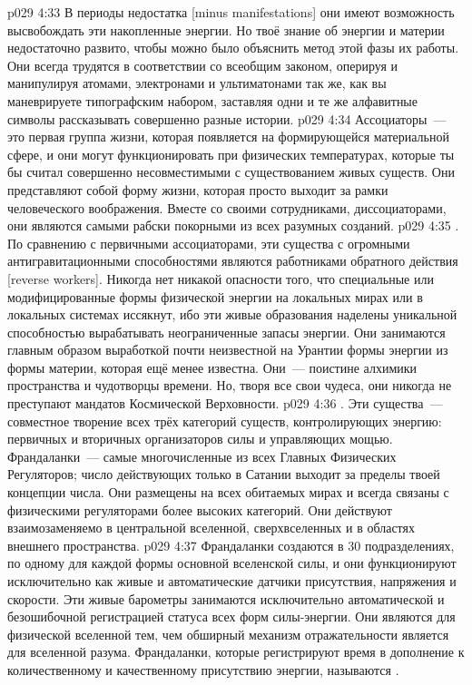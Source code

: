 \vs p029 4:33 В периоды недостатка [minus manifestations] они имеют возможность высвобождать эти накопленные энергии. Но твоё знание об энергии и материи недостаточно развито, чтобы можно было объяснить метод этой фазы их работы. Они всегда трудятся в соответствии со всеобщим законом, оперируя и манипулируя атомами, электронами и ультиматонами так же, как вы маневрируете типографским набором, заставляя одни и те же алфавитные символы рассказывать совершенно разные истории.
\vs p029 4:34 Ассоциаторы~--- это первая группа жизни, которая появляется на формирующейся материальной сфере, и они могут функционировать при физических температурах, которые ты бы считал совершенно несовместимыми с существованием живых существ. Они представляют собой форму жизни, которая просто выходит за рамки человеческого воображения. Вместе со своими сотрудниками, диссоциаторами, они являются самыми рабски покорными из всех разумных созданий.
\vs p029 4:35 . По сравнению с первичными ассоциаторами, эти существа с огромными антигравитационными способностями являются работниками обратного действия [reverse workers]. Никогда нет никакой опасности того, что специальные или модифицированные формы физической энергии на локальных мирах или в локальных системах иссякнут, ибо эти живые образования наделены уникальной способностью вырабатывать неограниченные запасы энергии. Они занимаются главным образом выработкой почти неизвестной на Урантии формы энергии из формы материи, которая ещё менее известна. Они~--- поистине алхимики пространства и чудотворцы времени. Но, творя все свои чудеса, они никогда не преступают мандатов Космической Верховности.
\vs p029 4:36 . Эти существа~--- совместное творение всех трёх категорий существ, контролирующих энергию: первичных и вторичных организаторов силы и управляющих мощью. Франдаланки~--- самые многочисленные из всех Главных Физических Регуляторов; число действующих только в Сатании выходит за пределы твоей концепции числа. Они размещены на всех обитаемых мирах и всегда связаны с физическими регуляторами более высоких категорий. Они действуют взаимозаменяемо в центральной вселенной, сверхвселенных и в областях внешнего пространства.
\vs p029 4:37 Франдаланки создаются в 30 подразделениях, по одному для каждой формы основной вселенской силы, и они функционируют исключительно как живые и автоматические датчики присутствия, напряжения и скорости. Эти живые барометры занимаются исключительно автоматической и безошибочной регистрацией статуса всех форм силы\hyp{}энергии. Они являются для физической вселенной тем, чем обширный механизм отражательности является для вселенной разума. Франдаланки, которые регистрируют время в дополнение к количественному и качественному присутствию энергии, называются .
